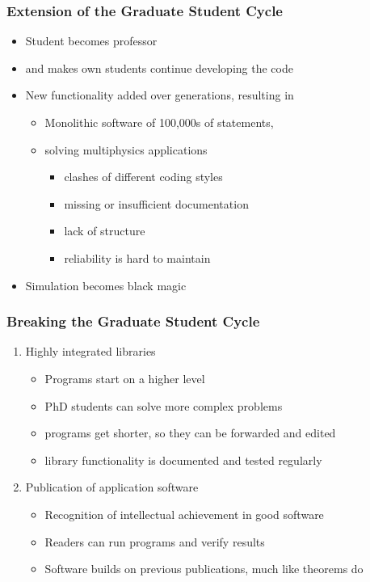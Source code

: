 \begin{frame}
  \frametitle{Extension of the Graduate Student Cycle}
  \begin{itemize}
  \item Student becomes professor
  \item and makes own students continue developing the code
  \item New functionality added over generations, resulting in
    \begin{itemize}
    \item  Monolithic software of 100,000s of statements,
    \item  solving multiphysics applications
      \begin{itemize}
      \item clashes of different coding styles
      \item missing or insufficient documentation
      \item lack of structure
      \item reliability is hard to maintain
      \end{itemize}
    \end{itemize}
  \item Simulation becomes black magic
  \end{itemize}
\end{frame}

\begin{frame}
  \frametitle{Breaking the Graduate Student Cycle}
  \begin{enumerate}
  \item Highly integrated libraries
    \begin{itemize}
    \item Programs start on a higher level
    \item PhD students can solve more complex problems
    \item programs get shorter, so they can be forwarded and edited
    \item library functionality is documented and tested regularly
    \end{itemize}
  \item Publication of application software
    \begin{itemize}
    \item Recognition of intellectual achievement in good software
    \item Readers can run programs and verify results
    \item Software builds on previous publications, much like theorems do
    \end{itemize}
  \end{enumerate}
\end{frame}

